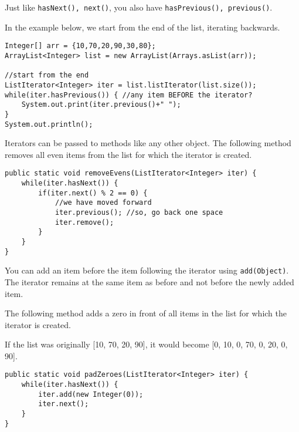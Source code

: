 Just like \texttt{hasNext(), next()}, you also have \texttt{hasPrevious(), previous()}.

In the example below, we start from the end of the list, iterating backwards.

\begin{lstlisting}
Integer[] arr = {10,70,20,90,30,80};
ArrayList<Integer> list = new ArrayList(Arrays.asList(arr));

//start from the end
ListIterator<Integer> iter = list.listIterator(list.size());
while(iter.hasPrevious()) { //any item BEFORE the iterator?
	System.out.print(iter.previous()+" ");
}
System.out.println();
\end{lstlisting}

Iterators can be passed to methods like any other object.
The following method removes all even items from the list for which the iterator is created.

\begin{lstlisting}
public static void removeEvens(ListIterator<Integer> iter) {
	while(iter.hasNext()) {
		if(iter.next() % 2 == 0) {
			//we have moved forward
			iter.previous(); //so, go back one space
			iter.remove(); 
		}
	}
}
\end{lstlisting}

You can add an item before the item following the iterator using \texttt{add(Object)}. The iterator remains at the same item as before and not before the newly added item.

The following method adds a zero in front of all items in the list for which the iterator is created. 

If the list was originally [10, 70, 20, 90], it would become [0, 10, 0, 70, 0, 20, 0, 90].

\begin{lstlisting}
public static void padZeroes(ListIterator<Integer> iter) {
	while(iter.hasNext()) {
		iter.add(new Integer(0)); 
		iter.next();
	}
}
\end{lstlisting}


